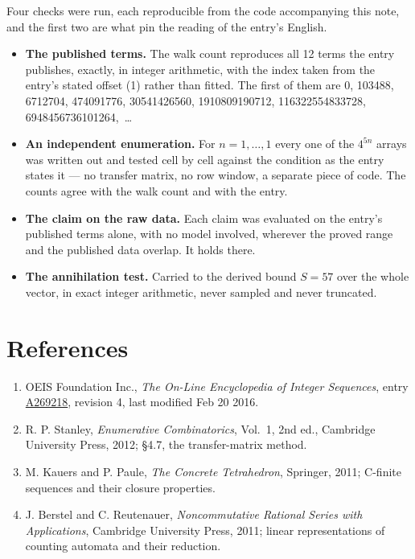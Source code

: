\documentclass[11pt]{article}
\theoremstyle{definition}
\begin{document}
Four checks were run, each reproducible from the code accompanying this note, and the first two are what pin the reading of the entry's English.

\begin{itemize}

\item {\bfseries The published terms.} The walk count reproduces all 12 terms the entry publishes, exactly, in integer arithmetic, with the index taken from the entry's stated offset (1) rather than fitted. The first of them are 0, 103488, 6712704, 474091776, 30541426560, 1910809190712, 116322554833728, 6948456736101264,~\dots

\item {\bfseries An independent enumeration.} For $n = 1,\dots,1$ every one of the $4^{5n}$ arrays was written out and tested cell by cell against the condition as the entry states it --- no transfer matrix, no row window, a separate piece of code. The counts agree with the walk count and with the entry.

\item {\bfseries The claim on the raw data.} Each claim was evaluated on the entry's published terms alone, with no model involved, wherever the proved range and the published data overlap. It holds there.

\item {\bfseries The annihilation test.} Carried to the derived bound $S = 57$ over the whole vector, in exact integer arithmetic, never sampled and never truncated.

\end{itemize}

\section{References}

\begin{enumerate}

\item OEIS Foundation Inc., \emph{The On-Line Encyclopedia of Integer Sequences}, entry \href{https://oeis.org/A269218}{A269218}, revision 4, last modified Feb 20 2016.

\item R. P. Stanley, \emph{Enumerative Combinatorics}, Vol.~1, 2nd ed., Cambridge University Press, 2012; \S4.7, the transfer-matrix method.

\item M. Kauers and P. Paule, \emph{The Concrete Tetrahedron}, Springer, 2011; C-finite sequences and their closure properties.

\item J. Berstel and C. Reutenauer, \emph{Noncommutative Rational Series with Applications}, Cambridge University Press, 2011; linear representations of counting automata and their reduction.

\end{enumerate}
\end{document}
